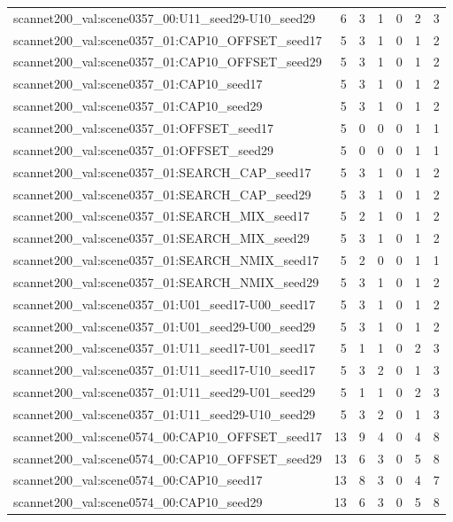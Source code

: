 \begin{table}[t]
\begin{tabular}{lrrrrrr}
scannet200\_val:scene0357\_00:U11\_seed29-U10\_seed29 & 6 & 3 & 1 & 0 & 2 & 3 \\
scannet200\_val:scene0357\_01:CAP10\_OFFSET\_seed17 & 5 & 3 & 1 & 0 & 1 & 2 \\
scannet200\_val:scene0357\_01:CAP10\_OFFSET\_seed29 & 5 & 3 & 1 & 0 & 1 & 2 \\
scannet200\_val:scene0357\_01:CAP10\_seed17 & 5 & 3 & 1 & 0 & 1 & 2 \\
scannet200\_val:scene0357\_01:CAP10\_seed29 & 5 & 3 & 1 & 0 & 1 & 2 \\
scannet200\_val:scene0357\_01:OFFSET\_seed17 & 5 & 0 & 0 & 0 & 1 & 1 \\
scannet200\_val:scene0357\_01:OFFSET\_seed29 & 5 & 0 & 0 & 0 & 1 & 1 \\
scannet200\_val:scene0357\_01:SEARCH\_CAP\_seed17 & 5 & 3 & 1 & 0 & 1 & 2 \\
scannet200\_val:scene0357\_01:SEARCH\_CAP\_seed29 & 5 & 3 & 1 & 0 & 1 & 2 \\
scannet200\_val:scene0357\_01:SEARCH\_MIX\_seed17 & 5 & 2 & 1 & 0 & 1 & 2 \\
scannet200\_val:scene0357\_01:SEARCH\_MIX\_seed29 & 5 & 3 & 1 & 0 & 1 & 2 \\
scannet200\_val:scene0357\_01:SEARCH\_NMIX\_seed17 & 5 & 2 & 0 & 0 & 1 & 1 \\
scannet200\_val:scene0357\_01:SEARCH\_NMIX\_seed29 & 5 & 3 & 1 & 0 & 1 & 2 \\
scannet200\_val:scene0357\_01:U01\_seed17-U00\_seed17 & 5 & 3 & 1 & 0 & 1 & 2 \\
scannet200\_val:scene0357\_01:U01\_seed29-U00\_seed29 & 5 & 3 & 1 & 0 & 1 & 2 \\
scannet200\_val:scene0357\_01:U11\_seed17-U01\_seed17 & 5 & 1 & 1 & 0 & 2 & 3 \\
scannet200\_val:scene0357\_01:U11\_seed17-U10\_seed17 & 5 & 3 & 2 & 0 & 1 & 3 \\
scannet200\_val:scene0357\_01:U11\_seed29-U01\_seed29 & 5 & 1 & 1 & 0 & 2 & 3 \\
scannet200\_val:scene0357\_01:U11\_seed29-U10\_seed29 & 5 & 3 & 2 & 0 & 1 & 3 \\
scannet200\_val:scene0574\_00:CAP10\_OFFSET\_seed17 & 13 & 9 & 4 & 0 & 4 & 8 \\
scannet200\_val:scene0574\_00:CAP10\_OFFSET\_seed29 & 13 & 6 & 3 & 0 & 5 & 8 \\
scannet200\_val:scene0574\_00:CAP10\_seed17 & 13 & 8 & 3 & 0 & 4 & 7 \\
scannet200\_val:scene0574\_00:CAP10\_seed29 & 13 & 6 & 3 & 0 & 5 & 8 \\

\end{tabular}
\end{table}
